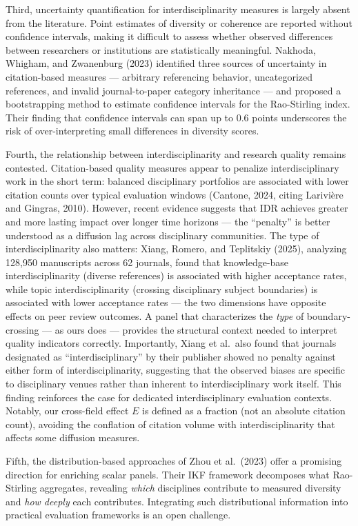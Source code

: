 \documentclass[
]{article}
\begin{document}
Third, uncertainty quantification for interdisciplinarity measures is
largely absent from the literature. Point estimates of diversity or
coherence are reported without confidence intervals, making it difficult
to assess whether observed differences between researchers or
institutions are statistically meaningful. Nakhoda, Whigham, and
Zwanenburg (2023) identified three sources of uncertainty in
citation-based measures --- arbitrary referencing behavior,
uncategorized references, and invalid journal-to-paper category
inheritance --- and proposed a bootstrapping method to estimate
confidence intervals for the Rao-Stirling index. Their finding that
confidence intervals can span up to 0.6 points underscores the risk of
over-interpreting small differences in diversity scores.

Fourth, the relationship between interdisciplinarity and research
quality remains contested. Citation-based quality measures appear to
penalize interdisciplinary work in the short term: balanced disciplinary
portfolios are associated with lower citation counts over typical
evaluation windows (Cantone, 2024, citing Larivière and Gingras, 2010).
However, recent evidence suggests that IDR achieves greater and more
lasting impact over longer time horizons --- the ``penalty'' is better
understood as a diffusion lag across disciplinary communities. The type
of interdisciplinarity also matters: Xiang, Romero, and Teplitskiy
(2025), analyzing 128,950 manuscripts across 62 journals, found that
knowledge-base interdisciplinarity (diverse references) is associated
with higher acceptance rates, while topic interdisciplinarity (crossing
disciplinary subject boundaries) is associated with lower acceptance
rates --- the two dimensions have opposite effects on peer review
outcomes. A panel that characterizes the \emph{type} of
boundary-crossing --- as ours does --- provides the structural context
needed to interpret quality indicators correctly. Importantly, Xiang et
al.~also found that journals designated as ``interdisciplinary'' by
their publisher showed no penalty against either form of
interdisciplinarity, suggesting that the observed biases are specific to
disciplinary venues rather than inherent to interdisciplinary work
itself. This finding reinforces the case for dedicated interdisciplinary
evaluation contexts. Notably, our cross-field effect \(E\) is defined as
a fraction (not an absolute citation count), avoiding the conflation of
citation volume with interdisciplinarity that affects some diffusion
measures.

Fifth, the distribution-based approaches of Zhou et al.~(2023) offer a
promising direction for enriching scalar panels. Their IKF framework
decomposes what Rao-Stirling aggregates, revealing \emph{which}
disciplines contribute to measured diversity and \emph{how deeply} each
contributes. Integrating such distributional information into practical
evaluation frameworks is an open challenge.
\end{document}
